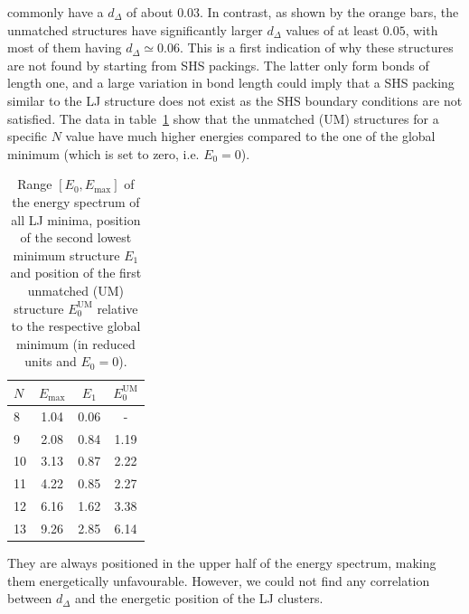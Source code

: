 commonly have a $d_\Delta$ of about $0.03$.  In contrast, as shown by the
orange bars, the unmatched structures have significantly larger $d_\Delta$
values of at least $0.05$, with most of them having $d_{\Delta} \simeq 0.06$.
This is a first indication of why these structures are not found by starting
from \ac{SHS} packings. The latter only form bonds of length one, and a large
variation in bond length could imply that a \ac{SHS} packing similar to the LJ
structure does not exist as the \ac{SHS} boundary conditions are not satisfied.  The
data in table~\ref{tab:energies} show that the unmatched (UM) structures for a
specific $N$ value have much higher energies compared to the one of the global
minimum (which is set to zero, i.e.  $E_0=0$). %
%
\begin{table}\centering
    \caption{Range $[E_0,E_\text{max}]$ of the energy spectrum of all LJ
    minima, position of the second lowest minimum structure $E_1$ and position
    of the first unmatched (UM) structure $E_0^\text{UM}$ relative to the
    respective global minimum (in reduced units and $E_0=0$).}
    \label{tab:energies}
        \begin{tabular}{lccc}\toprule
        $N$ & $E_\text{max}$ & $E_1$ & $E_0^\text{UM}$ \\\midrule
        8   & 1.04   & 0.06    & -           \\
        9   & 2.08   & 0.84    & 1.19        \\
        10  & 3.13   & 0.87    & 2.22        \\
        11  & 4.22   & 0.85    & 2.27        \\
        12  & 6.16   & 1.62    & 3.38        \\
        13  & 9.26   & 2.85    & 6.14        \\\bottomrule
        \end{tabular}
\end{table}%
%
They are always positioned in the upper half of the energy spectrum, making
them energetically unfavourable.  However, we could not find any correlation
between $d_\Delta$ and the energetic position of the LJ clusters.


